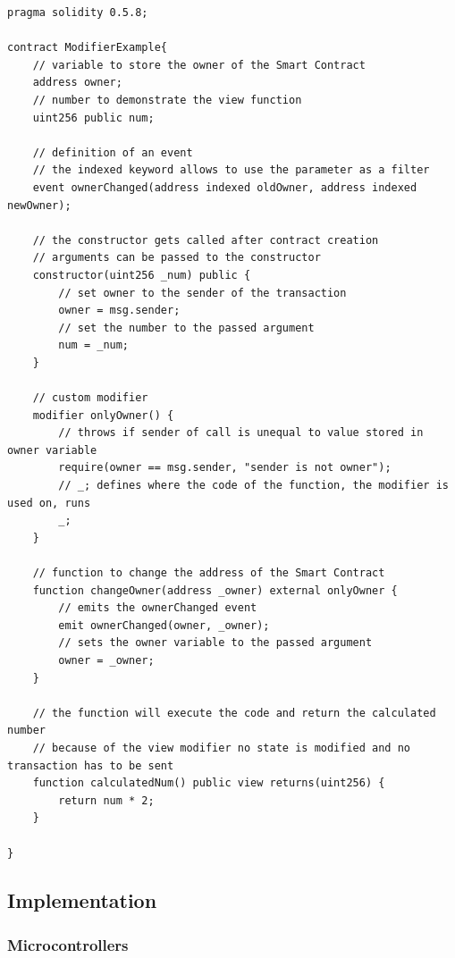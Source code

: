 \begin{lstlisting}[language=Solidity, caption={Basic structure of a Smart Contract}, label={lis:sc_basic_ref}]
pragma solidity 0.5.8;

contract ModifierExample{
    // variable to store the owner of the Smart Contract
    address owner;
    // number to demonstrate the view function
    uint256 public num;
    
    // definition of an event
    // the indexed keyword allows to use the parameter as a filter
    event ownerChanged(address indexed oldOwner, address indexed newOwner);
    
    // the constructor gets called after contract creation
    // arguments can be passed to the constructor
    constructor(uint256 _num) public {
        // set owner to the sender of the transaction
        owner = msg.sender;
        // set the number to the passed argument
        num = _num;
    }
    
    // custom modifier
    modifier onlyOwner() {
        // throws if sender of call is unequal to value stored in owner variable
        require(owner == msg.sender, "sender is not owner");
        // _; defines where the code of the function, the modifier is used on, runs
        _;
    }
    
    // function to change the address of the Smart Contract
    function changeOwner(address _owner) external onlyOwner {
        // emits the ownerChanged event
        emit ownerChanged(owner, _owner);
        // sets the owner variable to the passed argument
        owner = _owner;
    }
    
    // the function will execute the code and return the calculated number
    // because of the view modifier no state is modified and no transaction has to be sent
    function calculatedNum() public view returns(uint256) {
        return num * 2;
    }
    
}
\end{lstlisting}

\newpage
\subsection{Implementation}
\subsubsection{Microcontrollers}
